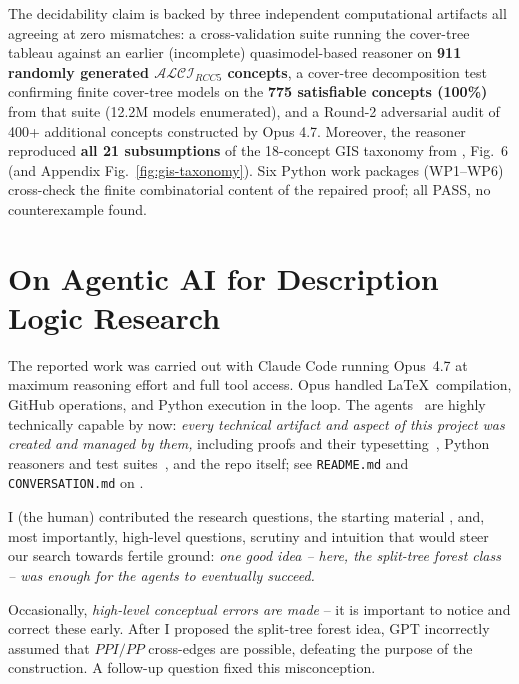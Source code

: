 \documentclass[
]{ceurart}
\theoremstyle{definition}
\newcommand{\ALCIRCC}[1]{\ensuremath{\mathcal{ALCI}_{\mathit{RCC#1}}}}
\begin{document}
The decidability claim is backed by three independent computational
artifacts all agreeing at zero mismatches: a cross-validation suite
running the cover-tree tableau \cite{CoverTreeImpl} against an earlier
(incomplete) quasimodel-based reasoner \cite{QuasimodelReasoner} on
\textbf{911 randomly generated \ALCIRCC{5} concepts}, a cover-tree
decomposition test confirming finite cover-tree models on the
\textbf{775 satisfiable concepts (100\%)} from that suite (12.2M
models enumerated), and a Round-2 adversarial audit of 400+ additional
concepts constructed by Opus 4.7. Moreover, the reasoner reproduced
\textbf{all 21 subsumptions} of the 18-concept GIS taxonomy from
\cite{Wessel2003}, Fig.~6 (and Appendix
Fig.~\ref{fig:gis-taxonomy}). Six Python work packages (WP1--WP6)
cross-check the finite combinatorial content of the repaired proof;
all PASS, no counterexample found.

\section{On Agentic AI for Description Logic Research}
\label{sec:agentic-ai}

The reported work was carried out with Claude Code running Opus~4.7 at
maximum reasoning effort and full tool access.  Opus handled
\LaTeX\ compilation, GitHub operations, and Python execution in the
loop. The agents~\cite{ClaudeOpus47,GPT54Pro,GPT55Repaired} are highly
technically capable by now: \emph{every technical artifact and aspect
of this project was created and managed by them,} including proofs
and their typesetting~\cite{SiblingCompleted,CoverTree,
  CompletenessExtraction,CoverTreeImpl,TwoTierQuotient,FWProof,
  TriangleBlocking,PatchworkAugmentation,
  TypedPatchworkCounterexample,ResponseGPTBlocking,StatusAfterFW,
  GPT55Repaired}, Python reasoners and test
suites~\cite{CoverTreeReasoner,QuasimodelReasoner,CyclicReasoner,
  ModelVerifier,DecompositionTest,StressTestCoverTree,
  StressTestCyclic,TestCyclicReasoner,GISTaxonomy}, and the repo
itself; see {\tt README.md} and {\tt CONVERSATION.md} on
\cite{ALCIRCC5Repo,ALCIRCC5Outdated}.

I (the human) contributed the research questions, the starting
material \cite{Wessel2002, Wessel2003, LutzWolter2006}, and, most
importantly, high-level questions, scrutiny and intuition that would
steer our search towards fertile ground: \emph{one good idea -- here, the
split-tree forest class -- was enough for the agents to eventually
succeed.}

Occasionally, \emph{high-level conceptual errors are made} -- it is
important to notice and correct these early. After I proposed the
split-tree forest idea, GPT incorrectly assumed that
$\mathit{PPI}/\mathit{PP}$ cross-edges are possible, defeating the
purpose of the construction. A follow-up question fixed this
misconception.
\end{document}
